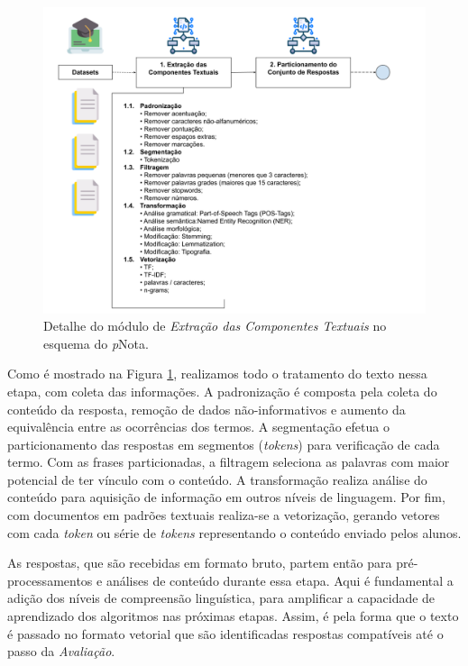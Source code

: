 \begin{figure}[!h]
\centering
\includegraphics[width=\textwidth]{figuras/esquema-ect-pNota.png}
\caption{Detalhe do módulo de \textit{Extração das Componentes Textuais} no esquema do \textit{p}Nota.}
\label{fig-ect}
\end{figure}

Como é mostrado na Figura \ref{fig-ect}, realizamos todo o tratamento do texto nessa etapa, com coleta das informações. A padronização é composta pela coleta do conteúdo da resposta, remoção de dados não-informativos e aumento da equivalência entre as ocorrências dos termos. A segmentação efetua o particionamento das respostas em segmentos (\textit{tokens}) para verificação de cada termo. Com as frases particionadas, a filtragem seleciona as palavras com maior potencial de ter vínculo com o conteúdo. A transformação realiza análise do conteúdo para aquisição de informação em outros níveis de linguagem. Por fim, com documentos em padrões textuais realiza-se a vetorização, gerando vetores com cada \textit{token} ou série de \textit{tokens} representando o conteúdo enviado pelos alunos.

As respostas, que são recebidas em formato bruto, partem então para pré-processamentos e análises de conteúdo durante essa etapa. Aqui é fundamental a adição dos níveis de compreensão linguística, para amplificar a capacidade de aprendizado dos algoritmos nas próximas etapas. Assim, é pela forma que o texto é passado no formato vetorial \cite{baeza2011} que são identificadas respostas compatíveis até o passo da \textit{Avaliação}.


